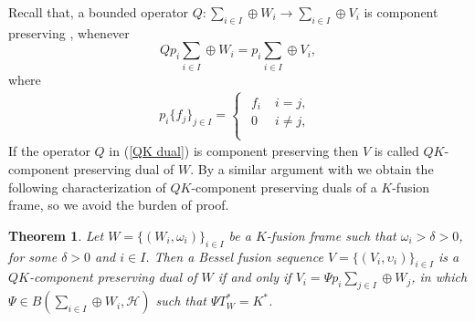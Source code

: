 \documentclass{birkjour}
\newtheorem{thm}{Theorem}[section]
\theoremstyle{definition}
\theoremstyle{remark}
\numberwithin{equation}{section}
\begin{document}
 Recall that, a bounded operator $Q:\sum_{i\in I}\oplus W_{i}\rightarrow \sum_{i\in I}\oplus V_{i}$  is component preserving \cite{Hei14}, whenever
\begin{equation*}
Qp_{i}\sum_{i\in I}\oplus W_{i} = p_{i}\sum_{i\in I}\oplus V_{i},
\end{equation*}
where
\begin{eqnarray*}
p_{i}\{f_{j}\}_{j\in I} =\begin{cases}
\begin{array}{ccc}
f_{i}& \;
{i=j}, \\
0& \; {i\neq} j, \\
\end{array}
\end{cases}
\end{eqnarray*}
 If the operator $Q$  in (\ref{QK dual}) is component preserving then $V$ is called $QK$-component preserving dual of $W$.
 By a similar argument with  \cite{Hei14} we obtain   the following characterization of $QK$-component preserving duals of  a $K$-fusion frame, so we avoid the burden of proof.
\begin{thm}
Let $W = \lbrace (W_{i}, \omega_{i})\rbrace_{i\in I}$  be a $K$-fusion frame such that $\omega_{i}>\delta>0$, for some $\delta>0$ and $i\in I$. Then a Bessel fusion sequence $V = \lbrace (V_{i}, \upsilon_{i})\rbrace_{i\in I}$ is a  $QK$-component preserving dual of $W$ if and only if $V_{i} = \Psi p_{i}\sum_{j\in I}\oplus W_{j}$, in which $\Psi\in B(\sum_{i\in I}\oplus W_{i}, \mathcal{H})$ such that $\Psi T_{W}^{*} = K^{*}$.
\end{thm}
\end{document}
